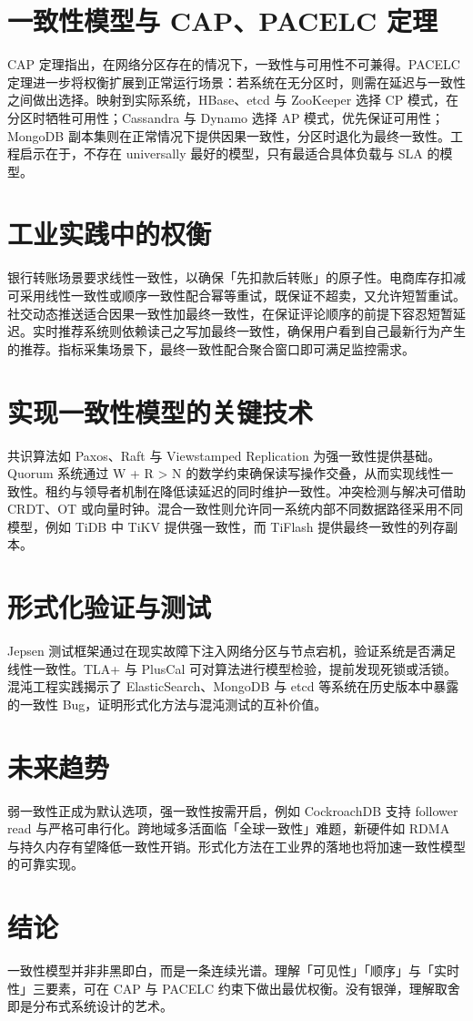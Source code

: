 \chapter{一致性模型与 CAP、PACELC 定理}
CAP 定理指出，在网络分区存在的情况下，一致性与可用性不可兼得。PACELC 定理进一步将权衡扩展到正常运行场景：若系统在无分区时，则需在延迟与一致性之间做出选择。映射到实际系统，HBase、etcd 与 ZooKeeper 选择 CP 模式，在分区时牺牲可用性；Cassandra 与 Dynamo 选择 AP 模式，优先保证可用性；MongoDB 副本集则在正常情况下提供因果一致性，分区时退化为最终一致性。工程启示在于，不存在 universally 最好的模型，只有最适合具体负载与 SLA 的模型。\par
\chapter{工业实践中的权衡}
银行转账场景要求线性一致性，以确保「先扣款后转账」的原子性。电商库存扣减可采用线性一致性或顺序一致性配合幂等重试，既保证不超卖，又允许短暂重试。社交动态推送适合因果一致性加最终一致性，在保证评论顺序的前提下容忍短暂延迟。实时推荐系统则依赖读己之写加最终一致性，确保用户看到自己最新行为产生的推荐。指标采集场景下，最终一致性配合聚合窗口即可满足监控需求。\par
\chapter{实现一致性模型的关键技术}
共识算法如 Paxos、Raft 与 Viewstamped Replication 为强一致性提供基础。Quorum 系统通过 W + R > N 的数学约束确保读写操作交叠，从而实现线性一致性。租约与领导者机制在降低读延迟的同时维护一致性。冲突检测与解决可借助 CRDT、OT 或向量时钟。混合一致性则允许同一系统内部不同数据路径采用不同模型，例如 TiDB 中 TiKV 提供强一致性，而 TiFlash 提供最终一致性的列存副本。\par
\chapter{形式化验证与测试}
Jepsen 测试框架通过在现实故障下注入网络分区与节点宕机，验证系统是否满足线性一致性。TLA+ 与 PlusCal 可对算法进行模型检验，提前发现死锁或活锁。混沌工程实践揭示了 ElasticSearch、MongoDB 与 etcd 等系统在历史版本中暴露的一致性 Bug，证明形式化方法与混沌测试的互补价值。\par
\chapter{未来趋势}
弱一致性正成为默认选项，强一致性按需开启，例如 CockroachDB 支持 follower read 与严格可串行化。跨地域多活面临「全球一致性」难题，新硬件如 RDMA 与持久内存有望降低一致性开销。形式化方法在工业界的落地也将加速一致性模型的可靠实现。\par
\chapter{结论}
一致性模型并非非黑即白，而是一条连续光谱。理解「可见性」「顺序」与「实时性」三要素，可在 CAP 与 PACELC 约束下做出最优权衡。没有银弹，理解取舍即是分布式系统设计的艺术。\par
